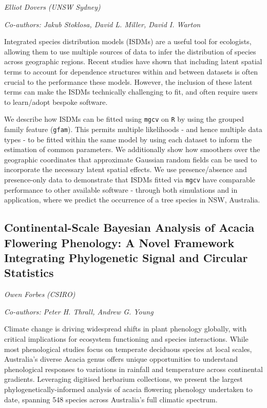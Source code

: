 \documentclass[
]{scrreprt}
\begin{document}
\emph{Elliot Dovers} \emph{(UNSW Sydney)}

\emph{Co-authors: Jakub Stoklosa, David L. Miller, David I. Warton}

\setlength{\parskip}{0.5em}

Integrated species distribution models (ISDMs) are a useful tool for
ecologists, allowing them to use multiple sources of data to infer the
distribution of species across geographic regions. Recent studies have
shown that including latent spatial terms to account for dependence
structures within and between datasets is often crucial to the
performance these models. However, the inclusion of these latent terms
can make the ISDMs technically challenging to fit, and often require
users to learn/adopt bespoke software.

We describe how ISDMs can be fitted using \texttt{mgcv} on \texttt{R} by
using the grouped family feature (\texttt{gfam}). This permits multiple
likelihoods - and hence multiple data types - to be fitted within the
same model by using each dataset to inform the estimation of common
parameters. We additionally show how smoothers over the geographic
coordinates that approximate Gaussian random fields can be used to
incorporate the necessary latent spatial effects. We use
presence/absence and presence-only data to demonstrate that ISDMs fitted
via \texttt{mgcv} have comparable performance to other available
software - through both simulations and in application, where we predict
the occurrence of a tree species in NSW, Australia.

\subsection{Continental-Scale Bayesian Analysis of Acacia Flowering
Phenology: A Novel Framework Integrating Phylogenetic Signal and
Circular
Statistics}\label{continental-scale-bayesian-analysis-of-acacia-flowering-phenology-a-novel-framework-integrating-phylogenetic-signal-and-circular-statistics}

\emph{Owen Forbes} \emph{(CSIRO)}

\emph{Co-authors: Peter H. Thrall, Andrew G. Young}

\setlength{\parskip}{0.5em}

Climate change is driving widespread shifts in plant phenology globally,
with critical implications for ecosystem functioning and species
interactions. While most phenological studies focus on temperate
deciduous species at local scales, Australia's diverse Acacia genus
offers unique opportunities to understand phenological responses to
variations in rainfall and temperature across continental gradients.
Leveraging digitised herbarium collections, we present the largest
phylogenetically-informed analysis of acacia flowering phenology
undertaken to date, spanning 548 species across Australia's full
climatic spectrum.
\end{document}
